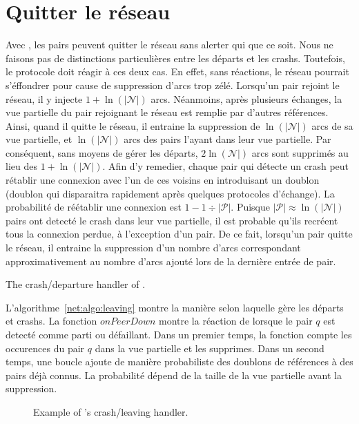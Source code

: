 \section{Quitter le réseau}
\label{net:sec:leaving}

Avec \SPRAY, les pairs peuvent quitter le réseau sans alerter qui que ce
soit. Nous ne faisons pas de distinctions particulières entre les départs et les
crashs. Toutefois, le protocole doit réagir à ces deux cas. En effet, sans
réactions, le réseau pourrait s'éffondrer pour cause de suppression d'arcs trop
zélé. Lorsqu'un pair rejoint le réseau, il y injecte $1+\ln(|\mathcal{N}|)$
arcs. Néanmoins, après plusieurs échanges, la vue partielle du pair rejoignant
le réseau est remplie par d'autres références. Ainsi, quand il quitte le réseau,
il entraine la suppression de $\ln(|\mathcal{N}|)$ arcs de sa vue partielle, et
$\ln(|\mathcal{N}|)$ arcs des pairs l'ayant dans leur vue partielle. Par
conséquent, sans moyens de gérer les départs, $2\ln(\mathcal{N}|)$ arcs sont
supprimés au lieu des $1+\ln(|\mathcal{N}|)$. Afin d'y remedier, chaque pair qui
détecte un crash peut rétablir une connexion avec l'un de ces voisins en
introduisant un doublon (doublon qui disparaitra rapidement après quelques
protocoles d'échange). La probabilité de réétablir une connexion est
$1-1\div{|\mathcal{P}|}$. Puisque ${|\mathcal{P}|}\approx \ln(|\mathcal{N}|)$
pairs ont detecté le crash dans leur vue partielle, il est probable qu'ils
recréent tous la connexion perdue, à l'exception d'un pair. De ce fait,
lorsqu'un pair quitte le réseau, il entraine la suppression d'un nombre d'arcs
correspondant approximativement au nombre d'arcs ajouté lors de la dernière
entrée de pair.

\begin{algorithm}[h]
  
  \caption{\label{net:algo:leaving}The crash/departure handler of \SPRAY.}
\end{algorithm}

L'algorithme~\ref{net:algo:leaving} montre la manière selon laquelle \SPRAY
gère les départs et crashs. La fonction $onPeerDown$ montre la réaction de
\SPRAY lorsque le pair $q$ est detecté comme parti ou défaillant. Dans un
premier temps, la fonction compte les occurences du pair $q$ dans la vue
partielle et les supprimes. Dans un second temps, une boucle ajoute de manière
probabiliste des doublons de références à des pairs déjà connus. La probabilité
dépend de la taille de la vue partielle avant la suppression.

\begin{figure*}
  \centering
  \hspace{40pt}
  \hspace{40pt}
  \caption{\label{net:fig:leavingexample}Example of \SPRAY's crash/leaving
    handler. }
\end{figure*}

